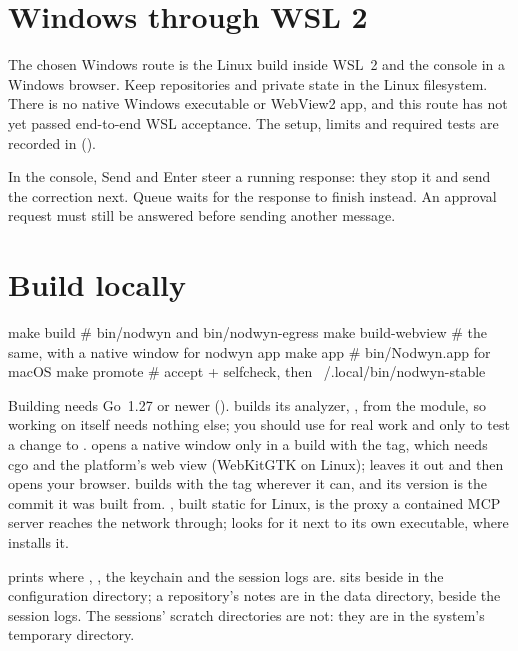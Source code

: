 \section{Windows through WSL 2}

The chosen Windows route is the Linux build inside WSL~2 and the console
in a Windows browser. Keep repositories and private state in the Linux
filesystem. There is no native Windows executable or WebView2 app, and
this route has not yet passed end-to-end WSL acceptance. The setup, limits
and required tests are recorded in  ().

In the console, Send and Enter steer a running response: they stop it and
send the correction next. Queue waits for the response to finish instead.
An approval request must still be answered before sending another message.

\section{Build locally}

\begin{sh}
make build                       # bin/nodwyn and bin/nodwyn-egress
make build-webview               # the same, with a native window for nodwyn app
make app                         # bin/Nodwyn.app for macOS
make promote                     # accept + selfcheck, then ~/.local/bin/nodwyn-stable
\end{sh}

Building needs Go~1.27 or newer ().  builds its
analyzer, , from the module, so working on \nodwyn{}
itself needs nothing else; you should use  for real
work and  only to test a change to \nodwyn{}.
 opens a native window only in a build with the
 tag, which needs cgo and the platform's web view (WebKitGTK
on Linux);  leaves it out and  then
opens your browser.  builds  with
the tag wherever it can, and its version is the commit it was built from.
, built static for Linux, is the proxy a contained MCP
server reaches the network through; \nodwyn{} looks for it next to its own
executable, where  installs it.

 prints where , ,
the keychain and the session logs are.  sits beside
 in the configuration directory; a repository's notes are
in the data directory, beside the session logs. The sessions' scratch
directories are not: they are in the system's temporary directory.

